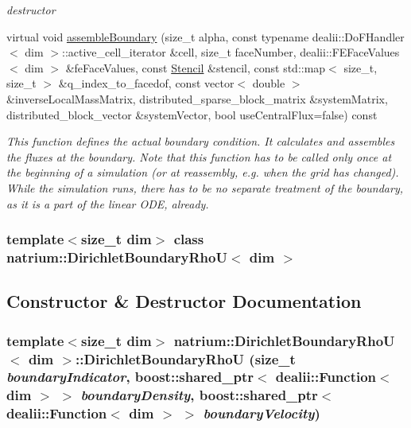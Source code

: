 \begin{DoxyCompactItemize}
\begin{DoxyCompactList}\small\item\em destructor \item\end{DoxyCompactList}\item 
virtual void \hyperlink{classnatrium_1_1DirichletBoundaryRhoU_a9fecb00df16c4294d9852222ddbdb4ca}{assembleBoundary} (size\_\-t alpha, const typename dealii::DoFHandler$<$ dim $>$::active\_\-cell\_\-iterator \&cell, size\_\-t faceNumber, dealii::FEFaceValues$<$ dim $>$ \&feFaceValues, const \hyperlink{classnatrium_1_1Stencil}{Stencil} \&stencil, const std::map$<$ size\_\-t, size\_\-t $>$ \&q\_\-index\_\-to\_\-facedof, const vector$<$ double $>$ \&inverseLocalMassMatrix, distributed\_\-sparse\_\-block\_\-matrix \&systemMatrix, distributed\_\-block\_\-vector \&systemVector, bool useCentralFlux=false) const 
\begin{DoxyCompactList}\small\item\em This function defines the actual boundary condition. It calculates and assembles the fluxes at the boundary. Note that this function has to be called only once at the beginning of a simulation (or at reassembly, e.g. when the grid has changed). While the simulation runs, there has to be no separate treatment of the boundary, as it is a part of the linear ODE, already. \item\end{DoxyCompactList}\end{DoxyCompactItemize}
\subsubsection*{template$<$size\_\-t dim$>$ class natrium::DirichletBoundaryRhoU$<$ dim $>$}



\subsection{Constructor \& Destructor Documentation}
\hypertarget{classnatrium_1_1DirichletBoundaryRhoU_a72588bbed7cb004e02aaa562083a5527}{
\subsubsection[{DirichletBoundaryRhoU}]{\setlength{\rightskip}{0pt plus 5cm}template$<$size\_\-t dim$>$ {\bf natrium::DirichletBoundaryRhoU}$<$ dim $>$::{\bf DirichletBoundaryRhoU} (size\_\-t {\em boundaryIndicator}, \/  boost::shared\_\-ptr$<$ dealii::Function$<$ dim $>$ $>$ {\em boundaryDensity}, \/  boost::shared\_\-ptr$<$ dealii::Function$<$ dim $>$ $>$ {\em boundaryVelocity})}}
\label{classnatrium_1_1DirichletBoundaryRhoU_a72588bbed7cb004e02aaa562083a5527}


